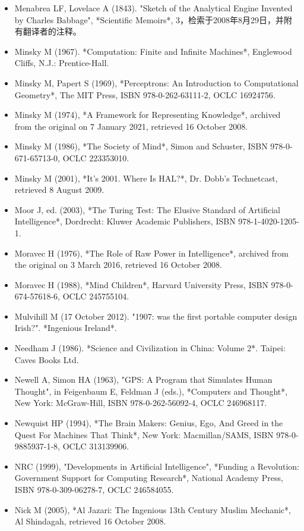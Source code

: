 \begin{itemize}
\item Menabrea LF, Lovelace A (1843). "Sketch of the Analytical Engine Invented by Charles Babbage", *Scientific Memoirs*, 3，检索于2008年8月29日，并附有翻译者的注释。  
\item Minsky M (1967). *Computation: Finite and Infinite Machines*, Englewood Cliffs, N.J.: Prentice-Hall.
\item Minsky M, Papert S (1969), *Perceptrons: An Introduction to Computational Geometry*, The MIT Press, ISBN 978-0-262-63111-2, OCLC 16924756.  
\item Minsky M (1974), *A Framework for Representing Knowledge*, archived from the original on 7 January 2021, retrieved 16 October 2008.  
\item Minsky M (1986), *The Society of Mind*, Simon and Schuster, ISBN 978-0-671-65713-0, OCLC 223353010.  
\item Minsky M (2001), *It's 2001. Where Is HAL?*, Dr. Dobb's Technetcast, retrieved 8 August 2009.  
\item Moor J, ed. (2003), *The Turing Test: The Elusive Standard of Artificial Intelligence*, Dordrecht: Kluwer Academic Publishers, ISBN 978-1-4020-1205-1.  
\item Moravec H (1976), *The Role of Raw Power in Intelligence*, archived from the original on 3 March 2016, retrieved 16 October 2008.  
\item Moravec H (1988), *Mind Children*, Harvard University Press, ISBN 978-0-674-57618-6, OCLC 245755104.
\item Mulvihill M (17 October 2012). "1907: was the first portable computer design Irish?". *Ingenious Ireland*.  
\item Needham J (1986). *Science and Civilization in China: Volume 2*. Taipei: Caves Books Ltd.  
\item Newell A, Simon HA (1963), "GPS: A Program that Simulates Human Thought", in Feigenbaum E, Feldman J (eds.), *Computers and Thought*, New York: McGraw-Hill, ISBN 978-0-262-56092-4, OCLC 246968117.  
\item Newquist HP (1994), *The Brain Makers: Genius, Ego, And Greed in the Quest For Machines That Think*, New York: Macmillan/SAMS, ISBN 978-0-9885937-1-8, OCLC 313139906.  
\item NRC (1999), "Developments in Artificial Intelligence", *Funding a Revolution: Government Support for Computing Research*, National Academy Press, ISBN 978-0-309-06278-7, OCLC 246584055.  
\item Nick M (2005), *Al Jazari: The Ingenious 13th Century Muslim Mechanic*, Al Shindagah, retrieved 16 October 2008.  

\end{itemize}
